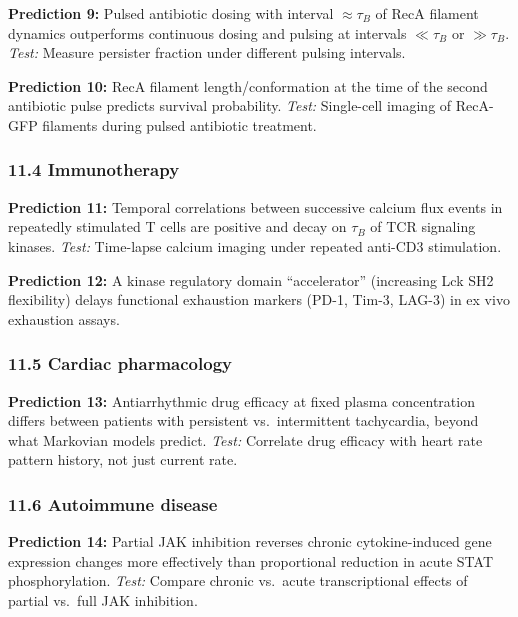 \documentclass[
]{article}
\begin{document}
\textbf{Prediction 9:} Pulsed antibiotic dosing with interval
\(\approx \tau_B\) of RecA filament dynamics outperforms continuous
dosing and pulsing at intervals \(\ll \tau_B\) or \(\gg \tau_B\).
\emph{Test:} Measure persister fraction under different pulsing
intervals.

\textbf{Prediction 10:} RecA filament length/conformation at the time of
the second antibiotic pulse predicts survival probability. \emph{Test:}
Single-cell imaging of RecA-GFP filaments during pulsed antibiotic
treatment.

\hypertarget{immunotherapy}{%
\subsubsection{11.4 Immunotherapy}\label{immunotherapy}}

\textbf{Prediction 11:} Temporal correlations between successive calcium
flux events in repeatedly stimulated T cells are positive and decay on
\(\tau_B\) of TCR signaling kinases. \emph{Test:} Time-lapse calcium
imaging under repeated anti-CD3 stimulation.

\textbf{Prediction 12:} A kinase regulatory domain ``accelerator''
(increasing Lck SH2 flexibility) delays functional exhaustion markers
(PD-1, Tim-3, LAG-3) in ex vivo exhaustion assays.

\hypertarget{cardiac-pharmacology-1}{%
\subsubsection{11.5 Cardiac pharmacology}\label{cardiac-pharmacology-1}}

\textbf{Prediction 13:} Antiarrhythmic drug efficacy at fixed plasma
concentration differs between patients with persistent vs.~intermittent
tachycardia, beyond what Markovian models predict. \emph{Test:}
Correlate drug efficacy with heart rate pattern history, not just
current rate.

\hypertarget{autoimmune-disease-1}{%
\subsubsection{11.6 Autoimmune disease}\label{autoimmune-disease-1}}

\textbf{Prediction 14:} Partial JAK inhibition reverses chronic
cytokine-induced gene expression changes more effectively than
proportional reduction in acute STAT phosphorylation. \emph{Test:}
Compare chronic vs.~acute transcriptional effects of partial vs.~full
JAK inhibition.
\end{document}
